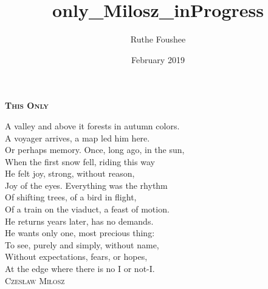\documentclass[14pt]{memoir}
\title{only_Milosz_inProgress}
\author{Ruthe Foushee}
\date{February 2019}
\begin{document}
\thispagestyle{empty}
\textbf{\textsc{\large This Only}}
\vspace{38pt}

A valley and above it forests in autumn colors.\\
A voyager arrives, a map led him here.\\
Or perhaps memory. Once, long ago, in the sun,\\
When the first snow fell, riding this way\\
He felt joy, strong, without reason,\\
Joy of the eyes. Everything was the rhythm\\
Of shifting trees, of a bird in flight,\\
Of a train on the viaduct, a feast of motion.\\
He returns years later, has no demands.\\
He wants only one, most precious thing:\\
To see, purely and simply, without name,\\
Without expectations, fears, or hopes,\\
At the edge where there is no I or not-I.\\

\vspace{24pt}
\hspace{94pt} \textsc{Czesław Miłosz}\\
\vfill
\end{document}
